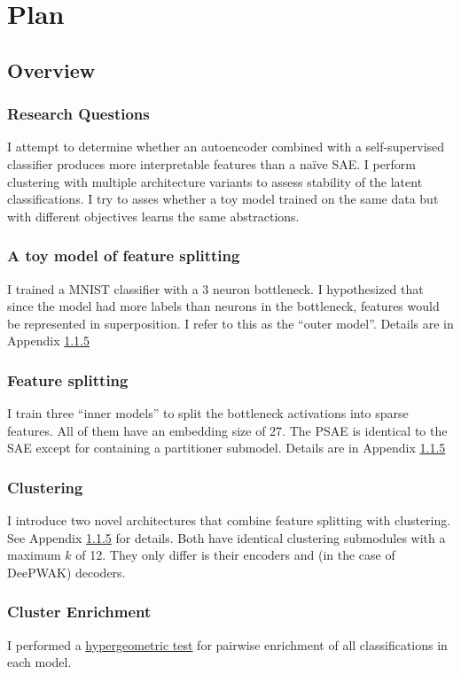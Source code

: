 \section{Plan}
\subsection{Overview}

\subsubsection{Research Questions}
I attempt to determine whether an autoencoder combined with a self-supervised classifier produces more interpretable features than a na\"ive SAE.
I perform clustering with multiple architecture variants to assess stability of the latent classifications.
I try to asses whether a toy model trained on the same data but with different objectives learns the same abstractions.

\subsubsection{A toy model of feature splitting}
I trained a MNIST classifier with a 3 neuron bottleneck.
I hypothesized that since the model had more labels than neurons in the bottleneck, features would be represented in superposition.
I refer to this as the ``outer model''.
Details are in Appendix \ref{}

\subsubsection{Feature splitting}
I train three ``inner models'' to split the bottleneck activations into sparse features.
All of them have an embedding size of 27.
The PSAE is identical to the SAE except for containing a partitioner submodel.
Details are in Appendix \ref{}

\subsubsection{Clustering}
I introduce two novel architectures that combine feature splitting with clustering. See Appendix \ref{} for details.
Both have identical clustering submodules with a maximum $k$ of 12.
They only differ is their encoders and (in the case of DeePWAK) decoders.

\subsubsection{Cluster Enrichment}
I performed a
\hyperlink{https://en.wikipedia.org/wiki/Hypergeometric_distribution#Hypergeometric_test}{hypergeometric test}
for pairwise enrichment of all classifications in each model.

